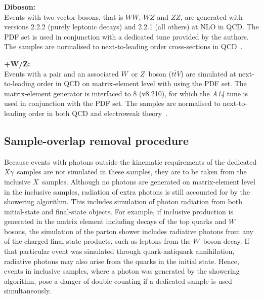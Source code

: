 \textbf{Diboson:}\\
Events with two vector bosons, that is $\mathit{WW}$, $\mathit{WZ}$ and $\mathit{ZZ}$, are generated with \sherpa versions 2.2.2 (purely leptonic decays) and 2.2.1 (all others) at NLO in QCD. The \nnpdfnnlo PDF set is used in conjunction with a dedicated tune provided by the \sherpa authors. The samples are normalised to next-to-leading order cross-sections in QCD~\cite{Campbell:1999ah}.

\textbf{\ttbar+W/Z:}\\
Events with a \ttbar pair and an associated $W$~or $Z$~boson ($t\bar{t}V$) are simulated at next-to-leading order in QCD on matrix-element level with \madgraph using the \nnpdfnlo PDF set.
The matrix-element generator is interfaced to \pythia{}8 (v8.210), for which the \emph{A14} tune is used in conjunction with the \nnpdflo PDF set.
The samples are normalised to next-to-leading order in both QCD and electroweak theory~\cite{deFlorian:2016spz}.


\subsection{Sample-overlap removal procedure}
\label{sec:sample-overlap-removal}


Because events with photons outside the kinematic requirements of the dedicated $X\gamma$~samples are not simulated in these samples, they are to be taken from the inclusive $X$~samples.
Although no photons are generated on matrix-element level in the inclusive samples, radiation of extra photons is still accounted for by the showering algorithm.
This includes simulation of photon radiation from both initial-state and final-state objects.
For example, if inclusive \ttbar production is generated in the matrix element including decays of the top quarks and $W$ bosons, the simulation of the parton shower includes radiative photons from any of the charged final-state products, such as leptons from the $W$~boson decay.
If that particular \ttbar event was simulated through quark-antiquark annihilation, radiative photons may also arise from the quarks in the initial state.
Hence, events in inclusive samples, where a photon was generated by the showering algorithm, pose a danger of double-counting if a dedicated sample is used simultaneously.

